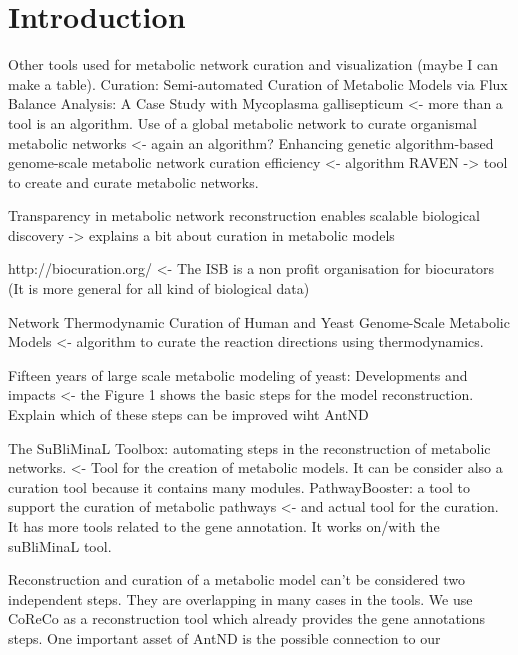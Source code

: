 \section{Introduction}

Other tools used for metabolic network curation and visualization (maybe I can make a table).
Curation: 
Semi-automated Curation of Metabolic Models via Flux Balance Analysis: A Case Study with Mycoplasma gallisepticum <- more than a tool is an algorithm.
Use of a global metabolic network to curate organismal metabolic networks <- again an algorithm?
Enhancing genetic algorithm-based genome-scale metabolic network curation efficiency <- algorithm
RAVEN -> tool to create and curate metabolic networks.

Transparency in metabolic network reconstruction enables scalable biological discovery -> explains a bit about curation in metabolic models

http://biocuration.org/ <- The ISB is a non profit organisation for biocurators (It is more general for all kind of biological data)

Network Thermodynamic Curation of Human and Yeast Genome-Scale Metabolic Models <- algorithm to curate the reaction directions using thermodynamics.

Fifteen years of large scale metabolic modeling of yeast: Developments and impacts <- the Figure 1 shows the basic steps for the model reconstruction. Explain which of these steps can be improved wiht AntND

The SuBliMinaL Toolbox: automating steps in the reconstruction of metabolic networks. <- Tool for the creation of metabolic models. It can be consider also a curation tool because it contains many modules.
PathwayBooster: a tool to support the curation of metabolic pathways <- and actual tool for the curation. It has more tools related to the gene annotation. It works on/with the suBliMinaL tool.

Reconstruction and curation of a metabolic model can't be considered two independent steps. They are overlapping in many cases in the tools. We use CoReCo as a reconstruction tool which already provides the gene annotations steps. 
One important asset of AntND is the possible connection to our 

